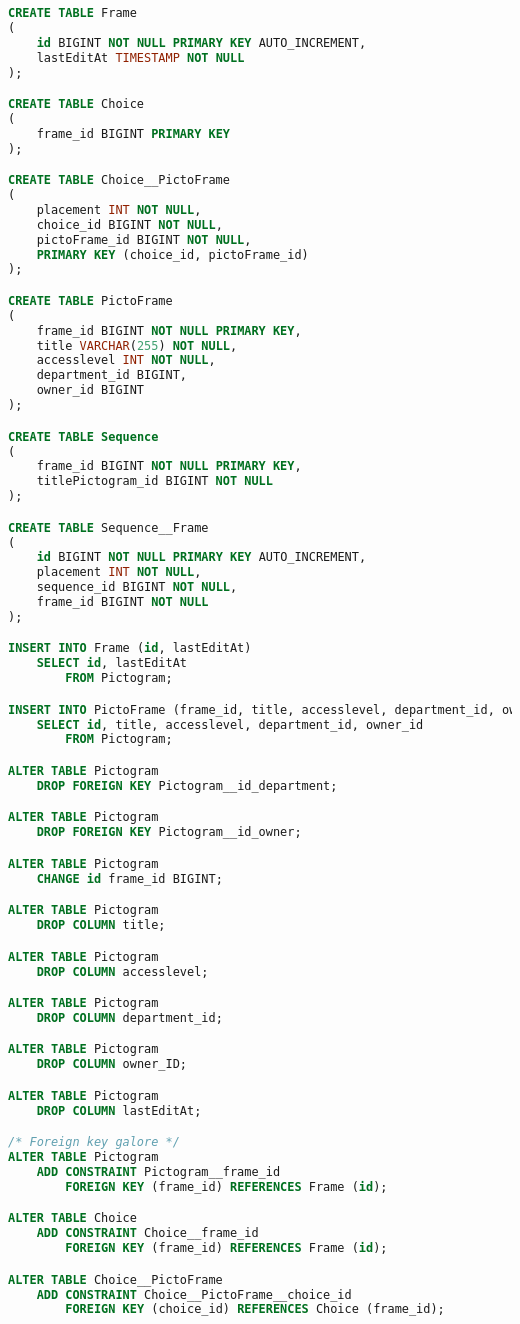 \begin{lstlisting}[language=sql]
CREATE TABLE Frame
(
    id BIGINT NOT NULL PRIMARY KEY AUTO_INCREMENT,
    lastEditAt TIMESTAMP NOT NULL
);

CREATE TABLE Choice
(
    frame_id BIGINT PRIMARY KEY
);

CREATE TABLE Choice__PictoFrame
(
    placement INT NOT NULL,
    choice_id BIGINT NOT NULL,
    pictoFrame_id BIGINT NOT NULL,
    PRIMARY KEY (choice_id, pictoFrame_id)
);

CREATE TABLE PictoFrame
(
    frame_id BIGINT NOT NULL PRIMARY KEY,
    title VARCHAR(255) NOT NULL,
    accesslevel INT NOT NULL,
    department_id BIGINT,
    owner_id BIGINT
);

CREATE TABLE Sequence
(
    frame_id BIGINT NOT NULL PRIMARY KEY,
    titlePictogram_id BIGINT NOT NULL
);

CREATE TABLE Sequence__Frame
(
    id BIGINT NOT NULL PRIMARY KEY AUTO_INCREMENT,
    placement INT NOT NULL,
    sequence_id BIGINT NOT NULL,
    frame_id BIGINT NOT NULL
);

INSERT INTO Frame (id, lastEditAt)
    SELECT id, lastEditAt
        FROM Pictogram;

INSERT INTO PictoFrame (frame_id, title, accesslevel, department_id, owner_id)
    SELECT id, title, accesslevel, department_id, owner_id
        FROM Pictogram;

ALTER TABLE Pictogram
    DROP FOREIGN KEY Pictogram__id_department;

ALTER TABLE Pictogram
    DROP FOREIGN KEY Pictogram__id_owner;

ALTER TABLE Pictogram
    CHANGE id frame_id BIGINT;

ALTER TABLE Pictogram
    DROP COLUMN title;

ALTER TABLE Pictogram
    DROP COLUMN accesslevel;

ALTER TABLE Pictogram
    DROP COLUMN department_id;

ALTER TABLE Pictogram
    DROP COLUMN owner_ID;

ALTER TABLE Pictogram
    DROP COLUMN lastEditAt;

/* Foreign key galore */
ALTER TABLE Pictogram
    ADD CONSTRAINT Pictogram__frame_id
        FOREIGN KEY (frame_id) REFERENCES Frame (id);

ALTER TABLE Choice
    ADD CONSTRAINT Choice__frame_id
        FOREIGN KEY (frame_id) REFERENCES Frame (id);

ALTER TABLE Choice__PictoFrame
    ADD CONSTRAINT Choice__PictoFrame__choice_id
        FOREIGN KEY (choice_id) REFERENCES Choice (frame_id);


\end{lstlisting}
